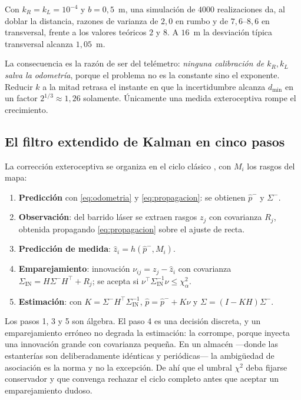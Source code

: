 \begin{observacion}
\label{obs:cubo-num}
Con $k_R=k_L=10^{-4}$ y $b=0{,}5$~m, una simulación de $4000$ realizaciones da,
al doblar la distancia, razones de varianza de $2{,}0$ en rumbo y de
$7{,}6$--$8{,}6$ en transversal, frente a los valores teóricos $2$ y $8$. A
$16$~m la desviación típica transversal alcanza $1{,}05$~m.

La consecuencia es la razón de ser del telémetro: \emph{ninguna calibración de
$k_R,k_L$ salva la odometría}, porque el problema no es la constante sino el
exponente. Reducir $k$ a la mitad retrasa el instante en que la incertidumbre
alcanza $d_{\min}$ en un factor $2^{1/3}\approx1{,}26$ solamente. Únicamente una
medida exteroceptiva rompe el crecimiento.
\end{observacion}

\subsection{El filtro extendido de Kalman en cinco pasos}

La corrección exteroceptiva se organiza en el ciclo clásico
\cite{siegwart2011introduction}, con $M_i$ los rasgos del mapa:

\begin{enumerate}[leftmargin=2.1em,topsep=0.2em,itemsep=0.25em]
  \item \textbf{Predicción} con \eqref{eq:odometria} y \eqref{eq:propagacion}:
  se obtienen $\hat p^{-}$ y $\Sigma^{-}$.
  \item \textbf{Observación}: del barrido láser se extraen rasgos $z_j$ con
  covarianza $R_j$, obtenida propagando \eqref{eq:propagacion} sobre el ajuste
  de recta.
  \item \textbf{Predicción de medida}: $\hat z_i=h(\hat p^{-},M_i)$.
  \item \textbf{Emparejamiento}: innovación $\nu_{ij}=z_j-\hat z_i$ con
  covarianza $\Sigma_{\mathrm{IN}}=H\Sigma^{-}H^{\!\top}+R_j$; se acepta si
  $\nu^{\!\top}\Sigma_{\mathrm{IN}}^{-1}\nu\le\chi^2_{\alpha}$.
  \item \textbf{Estimación}: con $K=\Sigma^{-}H^{\!\top}\Sigma_{\mathrm{IN}}^{-1}$,
  $\hat p=\hat p^{-}+K\nu$ y $\Sigma=(I-KH)\Sigma^{-}$.
\end{enumerate}

\begin{observacion}
\label{obs:emparejamiento}
Los pasos 1, 3 y 5 son álgebra. El paso 4 es una decisión discreta, y un
emparejamiento erróneo no degrada la estimación: la corrompe, porque inyecta una
innovación grande con covarianza pequeña. En un almacén —donde las estanterías
son deliberadamente idénticas y periódicas— la ambigüedad de asociación es la
norma y no la excepción. De ahí que el umbral $\chi^2$ deba fijarse conservador
y que convenga rechazar el ciclo completo antes que aceptar un emparejamiento
dudoso.
\end{observacion}

